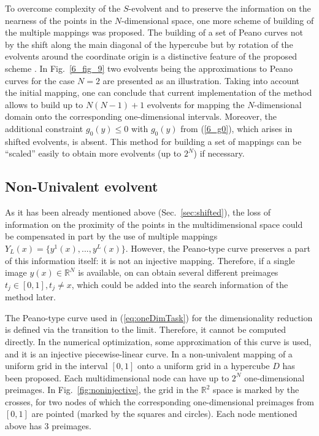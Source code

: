 \documentclass[procedia]{easychair}
\begin{document}
To overcome complexity of the $S$-evolvent and to preserve the information on the nearness of the points in
the $N$-dimensional space, one more scheme of building of the multiple mappings was proposed.
The building of a set of Peano curves not by the shift along the main diagonal of the hypercube
but by rotation of the evolvents around the coordinate origin is a distinctive feature of the
proposed scheme \cite{Gergel2009}.
In Fig.~\ref{6_fig_9} two evolvents being the approximations to Peano curves for the case
$N=2$ are presented as an illustration.
Taking into account the initial mapping, one can conclude that current implementation of the
method allows to build up to $N(N-1)+1$ evolvents for mapping the $N$-dimensional domain
onto the corresponding one-dimensional intervals. Moreover, the additional constraint  $g_0(y)
\leq 0$ with $g_0(y)$ from (\ref{6_g0}), which arises in shifted evolvents, is absent. This
method for building a set of mappings can be ``scaled'' easily to obtain more evolvents (up to
$2^N$) if necessary.


\subsection{Non-Univalent evolvent}

As it has been already mentioned above (Sec.~\ref{sec:shifted}), the loss of information on the
proximity of the points in the multidimensional space could be compensated in part by the use
of multiple mappings $Y_L(x)=\{y^1(x),...,y^L(x)\}$. However, the Peano-type curve preserves
a part of this information itself: it is not an injective mapping. Therefore, if a single image
$y(x)\in \mathbb{R}^N$ is available, on can obtain several different preimages
$t_j\in[0,1], t_j \not = x$, which could be added into the search information of the method later.

The Peano-type curve used in (\ref{eq:oneDimTask}) for the dimensionality reduction is
defined via the transition to the limit. Therefore, it cannot be computed directly. In the
numerical optimization, some approximation of this curve is used, and it is an injective piecewise-linear curve. In \cite{strongin1978} a non-univalent mapping of a uniform grid in the
interval $[0,1]$ onto a uniform grid in a hypercube $D$ has been proposed. Each
multidimensional node can have up to $2^N$ one-dimensional preimages. In
Fig.~\ref{fig:noninjective}, the grid in the $\mathbb{R}^2$ space is marked by the crosses, for
two nodes of which the corresponding one-dimensional preimages from $[0,1]$ are pointed
(marked by the squares and circles). Each node mentioned above has 3 preimages.
\end{document}
